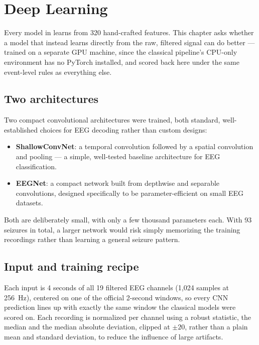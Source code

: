 \chapter{Deep Learning}
\label{chap:deeplearning}

Every model in  learns from 320 hand-crafted features. This chapter asks
whether a model that instead learns directly from the raw, filtered signal can do better ---
trained on a separate GPU machine, since the classical pipeline's CPU-only environment has no
PyTorch installed, and scored back here under the same event-level rules as everything else.

\section{Two architectures}

Two compact convolutional architectures were trained, both standard, well-established choices
for EEG decoding rather than custom designs:

\begin{itemize}[leftmargin=1.4em]
  \item \textbf{ShallowConvNet}: a temporal convolution followed by a spatial convolution and
    pooling --- a simple, well-tested baseline architecture for EEG classification.
  \item \textbf{EEGNet}: a compact network built from depthwise and separable convolutions,
    designed specifically to be parameter-efficient on small EEG datasets.
\end{itemize}

Both are deliberately small, with only a few thousand parameters each. With 93 seizures in
total, a larger network would risk simply memorizing the training recordings rather than
learning a general seizure pattern.

\section{Input and training recipe}

Each input is 4 seconds of all 19 filtered EEG channels (1{,}024 samples at 256~Hz), centered on
one of the official 2-second windows, so every CNN prediction lines up with exactly the same
window the classical models were scored on. Each recording is normalized per channel using a
robust statistic, the median and the median absolute deviation, clipped at $\pm 20$, rather than
a plain mean and standard deviation, to reduce the influence of large artifacts.

